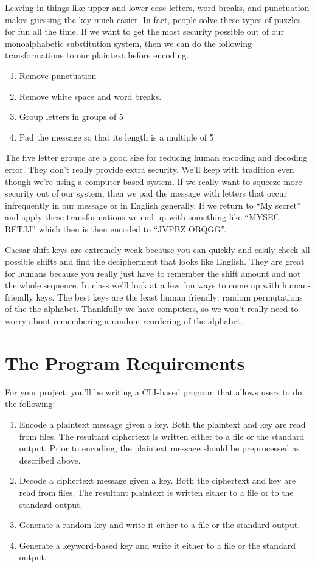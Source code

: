 \documentclass[]{tufte-handout}
\begin{document}
Leaving in things like upper and lower case letters, word breaks, and punctuation makes guessing the key much easier. In fact, people solve these types of puzzles for fun all the time. If we want to get the most security possible out of our monoalphabetic substitution system, then we can do the following transformations to our plaintext before encoding.
\begin{enumerate}
\item Remove punctuation
\item Remove white space and word breaks.
\item Group letters in groups of 5
\item Pad the message so that its length is a multiple of 5
\end{enumerate}
The five letter groups are a good size for reducing human encoding and decoding error.  They don't really provide extra security. We'll keep with tradition even though we're using a computer based system. If we really want to squeeze more security out of our system, then we pad the message with letters that occur infrequently in our message or in English generally. If we return to ``My secret'' and apply these transformations we end up with something like ``MYSEC RETJJ'' which then is then encoded to ``JVPBZ OBQGG''.    

Caesar shift keys are extremely weak because you can quickly and easily check all possible shifts and find the decipherment that looks like English. They are great for humans because you really just have to remember the shift amount and not the whole sequence. In class we'll look at a few fun ways to come up with human-friendly keys.  The best keys are the least human friendly: random permutations of the the alphabet. Thankfully we have computers, so we won't really need to worry about remembering a random reordering of the alphabet.

\section{The Program Requirements}

For your project, you'll be writing a CLI-based program that allows users to do the following:
\begin{enumerate}
\item Encode a plaintext message given a key. Both the plaintext and key are read from files. The resultant ciphertext is written either to a file or the standard output. Prior to encoding, the plaintext message should be preprocessed as described above.
\item Decode a ciphertext message given a key. Both the ciphertext and key are read from files. The resultant plaintext is written either to a file or to the standard output.
\item Generate a random key and write it either to a file or the standard output.  
\item Generate a keyword-based key and write it either to a file or the standard output.
\end{enumerate}
\end{document}

